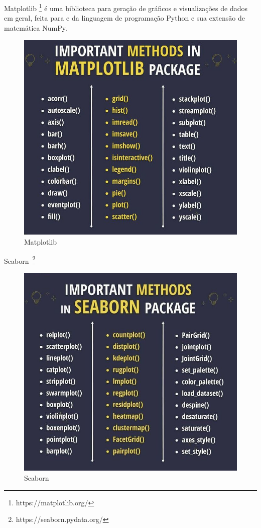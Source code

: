 Matplotlib \footnote{https://matplotlib.org/} é uma biblioteca para geração de gráficos e visualizações de dados em geral, feita para e da linguagem de programação Python e sua extensão de matemática NumPy.

\begin{figure}[!htp]
    \centering
    \includegraphics[scale=.9]{../img/python/matplotlib.jpeg}
    \caption{Matplotlib}
    \label{img:matplotlib}
\end{figure}

Seaborn~\footnote{https://seaborn.pydata.org/}
\begin{figure}[!htp]
    \centering
    \includegraphics[scale=.5]{../img/python/seaborn.jpeg}
    \caption{Seaborn}
    \label{img:seaborn}
\end{figure}


